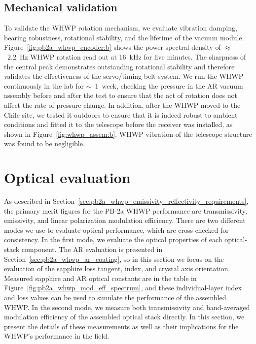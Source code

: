 
\subsection{Mechanical validation}
\label{sec:pb2a_whwp_mechanical_validation}

To validate the WHWP rotation mechanism, we evaluate vibration damping, bearing robustness, rotational stability, and the lifetime of the vacuum module. Figure~\ref{fig:pb2a_whwp_encoder:b} shows the power spectral density of $\approx$~2.2~Hz WHWP rotation read out at 16~kHz for five minutes. The sharpness of the central peak demonstrates outstanding rotational stability and therefore validates the effectiveness of the servo/timing belt system. We run the WHWP continuously in the lab for $\sim$~1~week, checking the pressure in the AR vacuum assembly before and after the test to ensure that the act of rotation does not affect the rate of pressure change. In addition, after the WHWP moved to the Chile site, we tested it outdoors to ensure that it is indeed robust to ambient conditions and fitted it to the telescope before the receiver was installed, as shown in Figure~\ref{fig:whwp_assem:b}. WHWP vibration of the telescope structure was found to be negligible.


\section{Optical evaluation}
\label{sec:pb2a_whwp_optical_evaluation}

As described in Section~\ref{sec:pb2a_whwp_emissivity_relfectivity_requirements}, the primary merit figures for the PB-2a WHWP performance are transmissivity, emissivity, and linear polarization modulation efficiency. There are two different modes we use to evaluate optical performance, which are cross-checked for consistency. In the first mode, we evaluate the optical properties of each optical-stack component. The AR evaluation is presented in Section~\ref{sec:pb2a_whwp_ar_coating}, so in this section we focus on the evaluation of the sapphire loss tangent, index, and crystal axis orientation. Measured sapphire and AR optical constants are in the table in Figure~\ref{fig:pb2a_whwp_mod_eff_spectrum}, and these individual-layer index and loss values can be used to simulate the performance of the assembled WHWP. In the second mode, we measure both transmissivity and band-averaged modulation efficiency of the assembled optical stack directly. In this section, we present the details of these measurements as well as their implications for the WHWP's performance in the field.

